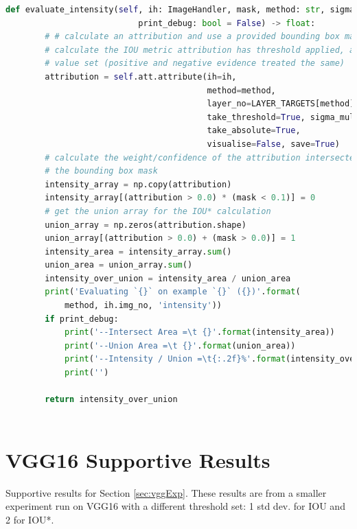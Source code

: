 \documentclass[main]{subfiles}
\begin{document}
\begin{lstlisting}[language=Python,basicstyle=\scriptsize]
    def evaluate_intensity(self, ih: ImageHandler, mask, method: str, sigma: int, 
                           print_debug: bool = False) -> float:
        # # calculate an attribution and use a provided bounding box mask to 
        # calculate the IOU metric attribution has threshold applied, and abs 
        # value set (positive and negative evidence treated the same)
        attribution = self.att.attribute(ih=ih,
                                         method=method,
                                         layer_no=LAYER_TARGETS[method][self.model_name],
                                         take_threshold=True, sigma_multiple=sigma, 
                                         take_absolute=True,
                                         visualise=False, save=True)
        # calculate the weight/confidence of the attribution intersected with 
        # the bounding box mask
        intensity_array = np.copy(attribution)
        intensity_array[(attribution > 0.0) * (mask < 0.1)] = 0
        # get the union array for the IOU* calculation
        union_array = np.zeros(attribution.shape)
        union_array[(attribution > 0.0) + (mask > 0.0)] = 1
        intensity_area = intensity_array.sum()
        union_area = union_array.sum()
        intensity_over_union = intensity_area / union_area
        print('Evaluating `{}` on example `{}` ({})'.format(
            method, ih.img_no, 'intensity'))
        if print_debug:
            print('--Intersect Area =\t {}'.format(intensity_area))
            print('--Union Area =\t {}'.format(union_area))
            print('--Intensity / Union =\t{:.2f}%'.format(intensity_over_union * 100))
            print('')

        return intensity_over_union



\end{lstlisting}


\chapter{VGG16 Supportive Results}

Supportive results for Section \ref{sec:vggExp}. These results are from a smaller experiment run on VGG16 with a different threshold set: 1 std dev. for IOU and 2 for IOU*.

\end{document}
